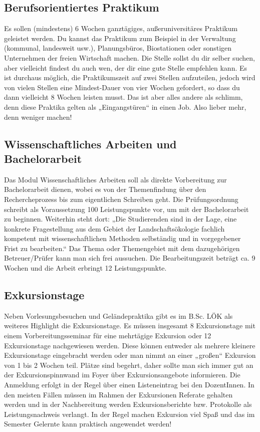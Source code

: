 \subsection*{Berufsorientiertes Praktikum}
Es sollen (mindestens) 6 Wochen ganztägiges, außeruniversitäres Praktikum geleistet werden. Du kannst das Praktikum zum Beispiel in der Verwaltung (kommunal, landesweit usw.), Planungsbüros, Biostationen oder sonstigen Unternehmen der freien Wirtschaft machen. Die Stelle sollst du dir selber suchen, aber vielleicht ﬁndest du auch wen, der dir eine gute Stelle empfehlen kann. Es ist durchaus möglich, die Praktikumszeit auf zwei Stellen aufzuteilen, jedoch wird von vielen Stellen eine Mindest-Dauer von vier Wochen gefordert, so dass du dann vielleicht 8 Wochen leisten musst. Das ist aber alles andere als schlimm, denn diese Praktika gelten als „Eingangstüren“ in einen Job. Also lieber mehr, denn weniger machen!

\subsection*{Wissenschaftliches Arbeiten und Bachelorarbeit}
Das Modul Wissenschaftliches Arbeiten soll als direkte Vorbereitung zur Bachelorarbeit dienen, wobei es von der Themenfindung über den Rechercheprozess bis zum eigentlichen Schreiben geht. Die Prüfungsordnung schreibt als Voraussetzung 100 Leistungspunkte vor, um mit der Bachelorarbeit zu beginnen. Weiterhin steht dort: „Die Studierenden sind in der Lage, eine konkrete Fragestellung aus dem Gebiet der Landschaftsökologie fachlich kompetent mit wissenschaftlichen Methoden selbständig und in vorgegebener Frist zu bearbeiten.“ Das Thema oder Themengebiet mit dem dazugehörigen Betreuer/Prüfer kann man sich frei aussuchen. Die Bearbeitungszeit beträgt ca. 9 Wochen und die Arbeit erbringt 12 Leistungspunkte.

\subsection*{Exkursionstage}
Neben Vorlesungsbesuchen und Geländepraktika gibt es im B.Sc. LÖK als weiteres Highlight die Exkursionstage. Es müssen insgesamt 8 Exkursionstage mit einem Vorbereitungsseminar für eine mehrtägige Exkursion oder 12 Exkursionstage nachgewiesen werden. Diese können entweder als mehrere kleinere Exkursionstage eingebracht werden oder man nimmt an einer „großen“ Exkursion von 1 bis 2 Wochen teil. Plätze sind begehrt, daher sollte man sich immer gut an der Exkursionspinnwand im Foyer über Exkursionsangebote informieren. Die Anmeldung erfolgt in der Regel über einen Listeneintrag bei den DozentInnen. In den meisten Fällen müssen im Rahmen der Exkursionen Referate gehalten werden und in der Nachbereitung werden Exkursionsberichte bzw. Protokolle als Leistungsnachweis verlangt. In der Regel machen Exkursion viel Spaß und das im Semester Gelernte kann  praktisch angewendet werden!

